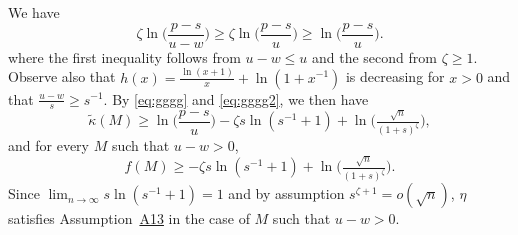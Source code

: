 \documentclass[bj,authoryear]{imsart}
\theoremstyle{plain}
\begin{document}
We have
\begin{equation}\label{eq:gggg2}
\zeta\ln\bigg(\frac{p-s}{u-w}\bigg) \geq \zeta\ln\bigg(\frac{p-s}{u}\bigg) \geq \ln\bigg(\frac{p-s}{u}\bigg).\end{equation}
where the first inequality follows from $u-w\leq u$ and the second from $\zeta\geq 1$.
Observe also that $h(x)= \frac{\ln(x+1)}{x}+\ln(1+{x}^{-1})$ is decreasing for $x>0$ and that $\frac{u-w}{s} \geq s^{-1}$. By \eqref{eq:gggg} and \eqref{eq:gggg2}, we then have 
\begin{equation*}
        \tilde{\kappa}(M) \geq \ln\big(\frac{p-s}{u}\big)-\zeta s\ln(s^{-1}+1)+ \ln \big(\tfrac{\sqrt{n}}{(1+s)^{\zeta}}\big),
\end{equation*}
and for every $M$ such that $u-w>0$,
\begin{equation}\label{eq:lowerboundb1ebic2}
        f(M) \geq -\zeta s\ln(s^{-1}+1)+ \ln \big(\tfrac{\sqrt{n}}{(1+s)^{\zeta}}\big).
\end{equation}
Since $\lim_{n\to\infty}s\ln(s^{-1}+1)=1$ and by assumption $s^{\zeta+1}=o(\sqrt{n})$, $\eta$ satisfies Assumption~\hyperlink{lab:A13}{A13} in the case of $M$ such that $u-w>0$.
\end{document}
